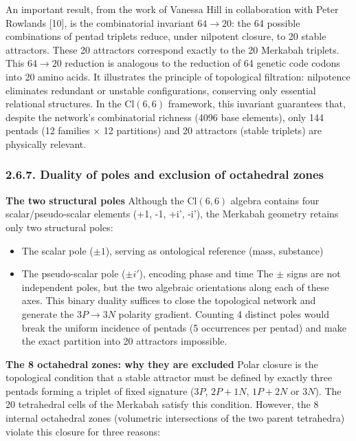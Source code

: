 \documentclass[11pt]{article}
\providecommand{\tightlist}{\setlength{\itemsep}{2pt}\setlength{\parskip}{6pt}}
\providecommand{\tightlist}{%
  \setlength{\itemsep}{2pt}\setlength{\parskip}{6pt}
}
\begin{document}
An important result, from the work of Vanessa Hill in collaboration with
Peter Rowlands {[}10{]}, is the combinatorial invariant \(64 \to 20\):
the 64 possible combinations of pentad triplets reduce, under nilpotent
closure, to 20 stable attractors. These 20 attractors correspond exactly
to the 20 Merkabah triplets. This \(64 \to 20\) reduction is analogous
to the reduction of 64 genetic code codons into 20 amino acids. It
illustrates the principle of topological filtration: nilpotence
eliminates redundant or unstable configurations, conserving only
essential relational structures. In the \(\text{Cl}(6,6)\) framework,
this invariant guarantees that, despite the network's combinatorial
richness (4096 base elements), only 144 pentads (12 families × 12
partitions) and 20 attractors (stable triplets) are physically relevant.

\hypertarget{duality-of-poles-and-exclusion-of-octahedral-zones}{%
\subsubsection{2.6.7. Duality of poles and exclusion of octahedral
zones}\label{duality-of-poles-and-exclusion-of-octahedral-zones}}

\textbf{The two structural poles} Although the \(\text{Cl}(6,6)\)
algebra contains four scalar/pseudo-scalar elements (+1, -1, +i', -i'),
the Merkabah geometry retains only two structural poles:

\begin{itemize}
\tightlist
\item
  The scalar pole (\(\pm 1\)), serving as ontological reference (mass,
  substance)
\item
  The pseudo-scalar pole (\(\pm i'\)), encoding phase and time The
  \(\pm\) signs are not independent poles, but the two algebraic
  orientations along each of these axes. This binary duality suffices to
  close the topological network and generate the \(3P \rightarrow 3N\)
  polarity gradient. Counting 4 distinct poles would break the uniform
  incidence of pentads (5 occurrences per pentad) and make the exact
  partition into 20 attractors impossible.
\end{itemize}

\textbf{The 8 octahedral zones: why they are excluded} Polar closure is
the topological condition that a stable attractor must be defined by
exactly three pentads forming a triplet of fixed signature (\(3P\),
\(2P+1N\), \(1P+2N\) or \(3N\)). The 20 tetrahedral cells of the
Merkabah satisfy this condition. However, the 8 internal octahedral
zones (volumetric intersections of the two parent tetrahedra) violate
this closure for three reasons:
\end{document}
